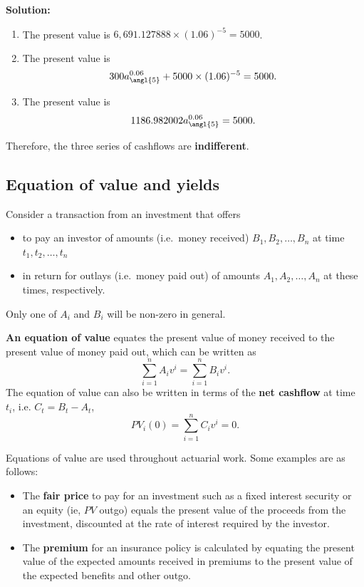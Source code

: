 \documentclass[landscape, 20pt]{extreport}
\theoremstyle{definition}
\theoremstyle{definition}
\theoremstyle{definition}
\theoremstyle{definition}
\theoremstyle{remark}
\begin{document}
\textbf{Solution:}

\begin{enumerate}
\def\labelenumi{\arabic{enumi}.}
\item
  The present value is \(6,691.127888 \times (1.06)^{-5} = 5000\).
\item
  The present value is
  \[300 a^{0.06}_{\angl{5}}   + 5000 \times (1.06)^{-5}  = 5000.\]
\item
  The present value is \[1186.982002 a^{0.06}_{\angl{5}}     = 5000.\]
\end{enumerate}

Therefore, the three series of cashflows are \textbf{indifferent}.

\newpage \hypertarget{equation-of-value-and-yields}{%
\subsection{Equation of value and yields}\label{equation-of-value-and-yields}}

Consider a transaction from an investment that offers

\begin{itemize}
\item
  to pay an investor of amounts (i.e.~money received)
  \(B_1, B_2, \ldots, B_n\) at time \(t_1, t_2, \ldots ,t_n\)
\item
  in return for outlays (i.e.~money paid out) of amounts
  \(A_1, A_2, \ldots, A_n\) at these times, respectively.
\end{itemize}

Only one of \(A_i\) and \(B_i\) will be non-zero in general.

\textbf{An equation of value} equates the present value of money received to
the present value of money paid out, which can be written as
\[\sum_{i=1}^n A_i v^i = \sum_{i=1}^n B_i v^i.\] The equation of value
can also be written in terms of the \textbf{net cashflow} at time \(t_i\), i.e.
\(C_t = B_t - A_t\), \[PV_i(0) = \sum_{i=1}^n C_i v^i =0.\]

Equations of value are used throughout actuarial work. Some examples are
as follows:

\begin{itemize}
\item
  The \textbf{fair price} to pay for an investment such as a fixed interest
  security or an equity (ie, \(PV\) outgo) equals the present value of
  the proceeds from the investment, discounted at the rate of interest
  required by the investor.
\item
  The \textbf{premium} for an insurance policy is calculated by equating
  the present value of the expected amounts received in premiums to
  the present value of the expected benefits and other outgo.
\end{itemize}
\end{document}
